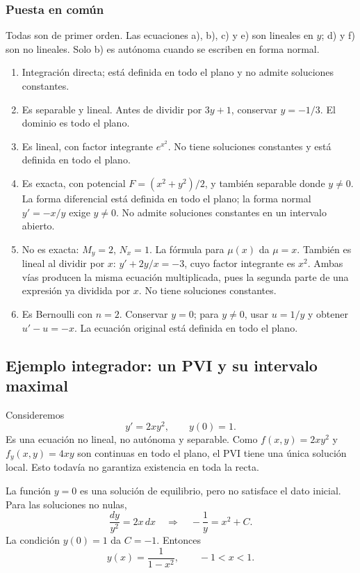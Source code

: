 \documentclass[12pt,a4paper]{article}
\begin{document}
	\subsubsection*{Puesta en común}

	Todas son de primer orden. Las ecuaciones a), b), c) y e) son lineales en \(y\); d) y f) son no lineales. Solo b) es autónoma cuando se escriben en forma normal.

	\begin{enumerate}[label=\alph*)]
		\item Integración directa; está definida en todo el plano y no admite soluciones constantes.
		\item Es separable y lineal. Antes de dividir por \(3y+1\), conservar \(y=-1/3\). El dominio es todo el plano.
		\item Es lineal, con factor integrante \(e^{x^2}\). No tiene soluciones constantes y está definida en todo el plano.
		\item Es exacta, con potencial \(F=(x^2+y^2)/2\), y también separable donde \(y\neq0\). La forma diferencial está definida en todo el plano; la forma normal \(y'=-x/y\) exige \(y\neq0\). No admite soluciones constantes en un intervalo abierto.
		\item No es exacta: \(M_y=2\), \(N_x=1\). La fórmula para \(\mu(x)\) da \(\mu=x\). También es lineal al dividir por \(x\): \(y'+2y/x=-3\), cuyo factor integrante es \(x^2\). Ambas vías producen la misma ecuación multiplicada, pues la segunda parte de una expresión ya dividida por \(x\). No tiene soluciones constantes.
		\item Es Bernoulli con \(n=2\). Conservar \(y=0\); para \(y\neq0\), usar \(u=1/y\) y obtener \(u'-u=-x\). La ecuación original está definida en todo el plano.
	\end{enumerate}

	\clearpage
	\subsection{Ejemplo integrador: un PVI y su intervalo maximal}

	Consideremos
	\[
	y'=2xy^2,\qquad y(0)=1.
	\]
	Es una ecuación no lineal, no autónoma y separable. Como \(f(x,y)=2xy^2\) y \(f_y(x,y)=4xy\) son continuas en todo el plano, el PVI tiene una única solución local. Esto todavía no garantiza existencia en toda la recta.

	La función \(y=0\) es una solución de equilibrio, pero no satisface el dato inicial. Para las soluciones no nulas,
	\[
	\frac{dy}{y^2}=2x\,dx
	\quad\Longrightarrow\quad
	-\frac{1}{y}=x^2+C.
	\]
	La condición \(y(0)=1\) da \(C=-1\). Entonces
	\[
	\boxed{y(x)=\frac{1}{1-x^2},\qquad -1<x<1.}
	\]
\end{document}
